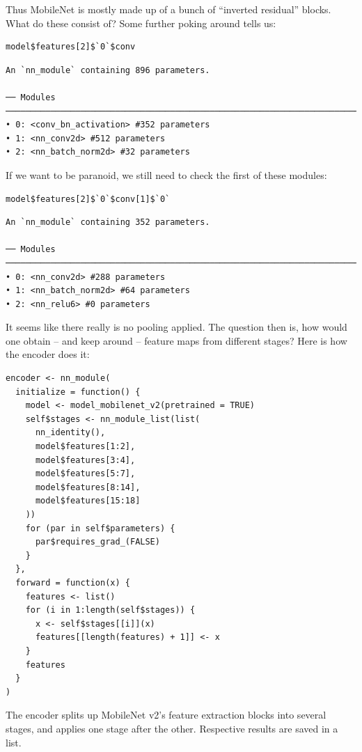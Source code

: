 \documentclass[
  letterpaper,
]{krantz}
\begin{document}
Thus MobileNet is mostly made up of a bunch of ``inverted residual''
blocks. What do these consist of? Some further poking around tells us:

\begin{verbatim}
model$features[2]$`0`$conv
\end{verbatim}

\begin{verbatim}
An `nn_module` containing 896 parameters.

── Modules ──────────────────────────────────────────────────────────────────────────────────
• 0: <conv_bn_activation> #352 parameters
• 1: <nn_conv2d> #512 parameters
• 2: <nn_batch_norm2d> #32 parameters
\end{verbatim}

If we want to be paranoid, we still need to check the first of these
modules:

\begin{verbatim}
model$features[2]$`0`$conv[1]$`0`
\end{verbatim}

\begin{verbatim}
An `nn_module` containing 352 parameters.

── Modules ─────────────────────────────────────────────────────────────────────────────────────────────
• 0: <nn_conv2d> #288 parameters
• 1: <nn_batch_norm2d> #64 parameters
• 2: <nn_relu6> #0 parameters
\end{verbatim}

It seems like there really is no pooling applied. The question then is,
how would one obtain -- and keep around -- feature maps from different
stages? Here is how the encoder does it:

\begin{verbatim}
encoder <- nn_module(
  initialize = function() {
    model <- model_mobilenet_v2(pretrained = TRUE)
    self$stages <- nn_module_list(list(
      nn_identity(),
      model$features[1:2],
      model$features[3:4],
      model$features[5:7],
      model$features[8:14],
      model$features[15:18]
    ))
    for (par in self$parameters) {
      par$requires_grad_(FALSE)
    }
  },
  forward = function(x) {
    features <- list()
    for (i in 1:length(self$stages)) {
      x <- self$stages[[i]](x)
      features[[length(features) + 1]] <- x
    }
    features
  }
)
\end{verbatim}

The encoder splits up MobileNet v2's feature extraction blocks into
several stages, and applies one stage after the other. Respective
results are saved in a list.
\end{document}
